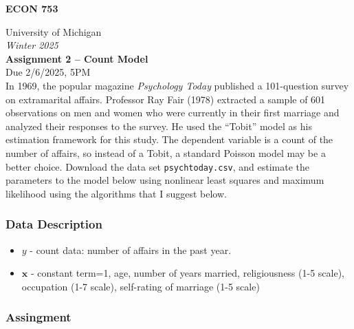 \documentclass[11pt]{article}
\newcommand{\bs}{\boldsymbol}
\begin{document}
\noindent
\textbf{ECON 753}

\noindent
University of Michigan\\
\emph{Winter 2025}\\[1em]

\noindent
\textbf{Assignment 2 -- Count Model}\\
Due 2/6/2025, 5PM\\[3em]


In 1969, the popular magazine \emph{Psychology Today} published a 101-question survey on extramarital affairs. Professor Ray Fair (1978) extracted a sample of 601 observations on men and women who were currently in their first marriage and analyzed their responses to the survey. He used the ``Tobit'' model as his estimation framework for this study. The dependent variable is a count of the number of affairs, so instead of a Tobit, a standard Poisson model may be a better choice. Download the data set \texttt{psychtoday.csv}, and estimate the parameters to the model below using nonlinear least squares and maximum likelihood using the algorithms that I suggest below. 

\subsubsection*{Data Description} %
 \label{ssub:data_description}

 \begin{itemize}
 	\item $y$ - count data: number of affairs in the past year.
 	\item $\bs{x}$ - constant term=1, age, number of years married, religiousness (1-5 scale), occupation (1-7 scale), self-rating of marriage (1-5 scale)
 \end{itemize}

\subsubsection*{Assingment} %
\label{ssub:assingment}
\end{document}
